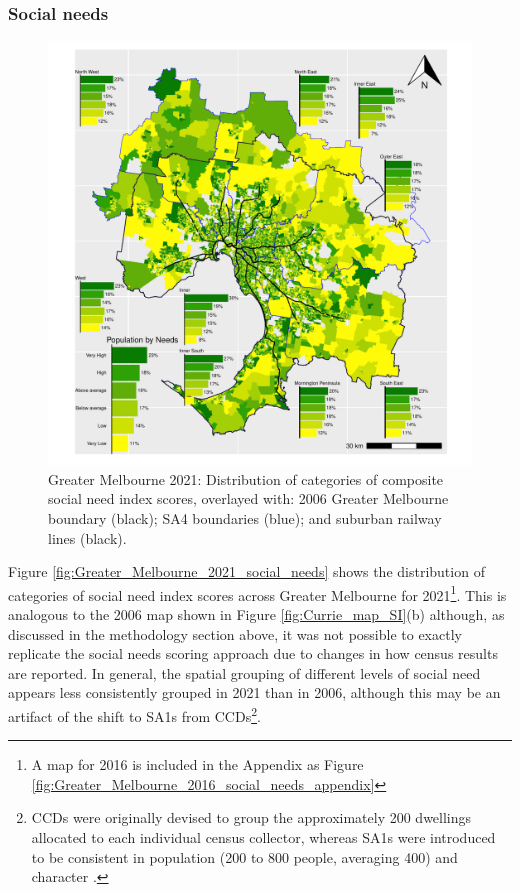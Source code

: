 \documentclass[preprint, 3p,
authoryear]{elsarticle} %
\begin{document}
\subsubsection{Social needs}\label{social-needs}

\begin{figure}
\centering
\includegraphics{ReynoldsCurrieQu2024_files/figure-latex/Greater_Melbourne_2021_social_needs-1.pdf}
\caption{Greater Melbourne 2021: Distribution of categories of composite
social need index scores, overlayed with: 2006 Greater Melbourne
boundary (black); SA4 boundaries (blue); and suburban railway lines
(black).}
\end{figure}

Figure \ref{fig:Greater_Melbourne_2021_social_needs} shows the
distribution of categories of social need index scores across Greater
Melbourne for 2021\footnote{A map for 2016 is included in the Appendix
  as Figure \ref{fig:Greater_Melbourne_2016_social_needs_appendix}}.
This is analogous to the 2006 map shown in Figure
\ref{fig:Currie_map_SI}(b) although, as discussed in the methodology
section above, it was not possible to exactly replicate the
\citet{currie2010identifying} social needs scoring approach due to
changes in how census results are reported. In general, the spatial
grouping of different levels of social need appears less consistently
grouped in 2021 than in 2006, although this may be an artifact of the
shift to SA1s from CCDs\footnote{CCDs were originally devised to group
  the approximately 200 dwellings allocated to each individual census
  collector, whereas SA1s were introduced to be consistent in population
  (200 to 800 people, averaging 400) and character
  \citep{ABS_SA1s_CCDs}.}.
\end{document}
